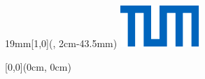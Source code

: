
\newcommand{\SeitenrandOben}{43.5mm}
\newcommand{\SeitenrandRechts}{20mm}
\newcommand{\SeitenrandLinks}{20mm}
\newcommand{\SeitenrandUnten}{10mm}

\newcommand{\UniversitaetLogoBreite}{19mm}
\newcommand{\UniversitaetLogoHoehe}{1cm}

\usepackage[a4paper,
    top=\SeitenrandOben,
    bottom=\SeitenrandUnten,
    inner=\SeitenrandLinks,
    outer=\SeitenrandRechts,
    foot=0cm,
    head=0cm
]{geometry}

\textblockorigin{\SeitenrandLinks}{\SeitenrandOben} %

\setlength{\parindent}{0pt}
\setlength{\parskip}{\baselineskip}
\TabPositions{4cm}
\pagestyle{empty}






\begin{textblock*}{\UniversitaetLogoBreite}[1,0](\textwidth-1mm, 2cm-\SeitenrandOben)%
    \raggedleft\includegraphics{./Ressourcen/Universitaet_Logo_RGB.pdf}%
\end{textblock*}


\begin{textblock*}{\textwidth}[0,0](0cm, 0cm)%
{\fontsize{24pt}{26pt}\selectfont\textbf{\Titel}}

\vspace*{14pt}
{\fontsize{18pt}{27pt}\selectfont\textbf{\Untertitel}}
\end{textblock*}

\vspace*{92.2mm}
\fontsize{15pt}{17.5pt}\selectfont%


